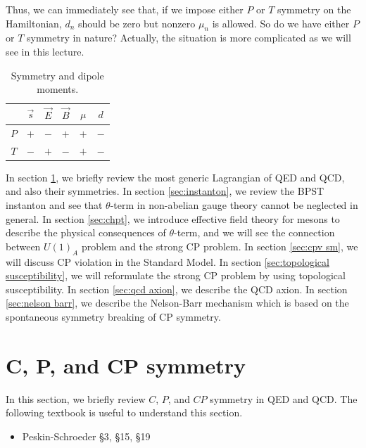 \documentclass[11pt,a4paper]{article}
\begin{document}
Thus, we can immediately see that, if we impose either $P$ or $T$ symmetry on the Hamiltonian, $d_n$ should be zero but nonzero $\mu_n$ is allowed.
So do we have either $P$ or $T$ symmetry in nature?
Actually, the situation is more complicated as we will see in this lecture.

\begin{table}
\centering
\begin{tabular}{c|ccc|cc}
& $\vec s$ & $\vec E$ & $\vec B$ & $\mu$ & $d$ \\\hline
$P$ & $+$ & $-$ & $+$ & $+$ & $-$ \\
$T$ & $-$ & $+$ & $-$ & $+$ & $-$ \\
\end{tabular}
\caption{Symmetry and dipole moments.} \label{tab:E, B, s and P and T}
\end{table}

In section \ref{sec:c p cp}, we briefly review the most generic Lagrangian of QED and QCD, and also their symmetries.
In section \ref{sec:instanton}, we review the BPST instanton and see that $\theta$-term in non-abelian gauge theory cannot be neglected in general.
In section \ref{sec:chpt}, we introduce effective field theory for mesons to describe the physical consequences of $\theta$-term, and we will see the connection between $U(1)_A$ problem and the strong CP problem.
In section \ref{sec:cpv sm}, we will discuss CP violation in the Standard Model.
In section \ref{sec:topological susceptibility}, we will reformulate the strong CP problem by using topological susceptibility.
In section \ref{sec:qcd axion}, we describe the QCD axion.
In section \ref{sec:nelson barr}, we describe the Nelson-Barr mechanism which is based on the spontaneous symmetry breaking of CP symmetry.

\section{C, P, and CP symmetry}\label{sec:c p cp}
In this section, we briefly review $C$, $P$, and $CP$ symmetry in QED and QCD. The following textbook is useful to understand this section.
\begin{itemize}
    \item Peskin-Schroeder \cite{Peskin:1995ev} \S 3, \S 15, \S 19
\end{itemize}
\end{document}
